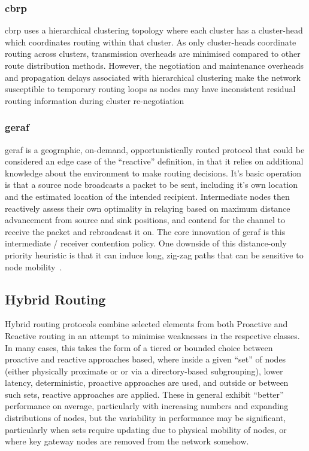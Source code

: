 {\subsubsection{\gls{cbrp}}
\gls{cbrp} uses a hierarchical clustering topology where each cluster has a cluster-head which coordinates routing within that cluster. As only cluster-heads coordinate routing across clusters, transmission overheads are minimised compared to other route distribution methods. However, the negotiation and maintenance overheads and propagation delays associated with hierarchical clustering make the network susceptible to temporary routing loops as nodes may have inconsistent residual routing information during cluster re-negotiation\\
\subsubsection{\gls{geraf}}
\gls{geraf} is a geographic, on-demand, opportunistically routed protocol that could be considered an edge case of the ``reactive'' definition, in that it relies on additional knowledge about the environment to make routing decisions.
It's basic operation is that a source node broadcasts a packet to be sent, including it's own location and the estimated location of the intended recipient.
Intermediate nodes then reactively assess their own optimality in relaying based on maximum distance advancement from source and sink positions, and contend for the channel to receive the packet and rebroadcast it on.
The core innovation of \gls{geraf} is this intermediate / receiver contention policy\cite{Zorzi2003,Zorzi2003a}.
One downside of this distance-only priority heuristic is that it can induce long, zig-zag paths that can be sensitive to node mobility~\cite{Jornet2008}.

\subsection{Hybrid Routing}

Hybrid routing protocols combine selected elements from both Proactive and Reactive routing  in an attempt to minimise weaknesses in the respective classes.
In many cases, this takes the form of a tiered or bounded choice between proactive and reactive approaches based, where inside a given ``set'' of nodes (either physically proximate or or via a directory-based subgrouping), lower latency, deterministic, proactive approaches are used, and outside or between such sets, reactive approaches are applied.
These in general exhibit ``better'' performance on average, particularly with increasing numbers and expanding distributions of nodes, but the variability in performance may be significant, particularly when sets require updating due to physical mobility of nodes, or where key gateway nodes are removed from the network somehow. 

}
